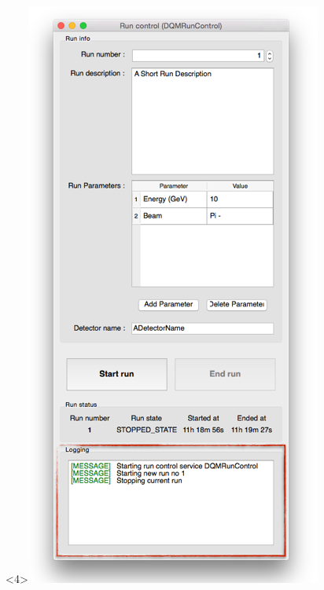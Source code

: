 \documentclass[8pt]{beamer}
\begin{document}
\begin{frame}
\begin{center}
\begin{overlayarea}{\textwidth}{\textheight}
\begin{columns}
\begin{center}
            \begin{onlyenv}<4>\includegraphics[width=\textwidth]{figs/RunControl/RunControl_logging.png}\end{onlyenv}
          \end{center}

\end{columns}
\end{overlayarea}
\end{center}
\end{frame}
\end{document}
